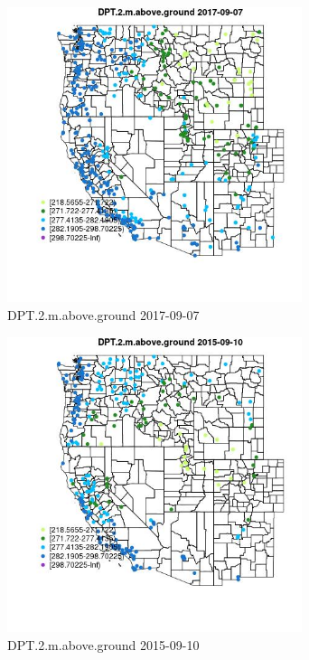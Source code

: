 \begin{figure} 
\centering  
\includegraphics[width=0.77\textwidth]{Code_Outputs/Report_ML_input_PM25_Step4_part_e_de_duplicated_aves_compiled_2019-05-21wNAs_MapObsDPT2maboveground2017-09-07.jpg} 
\caption{\label{fig:Report_ML_input_PM25_Step4_part_e_de_duplicated_aves_compiled_2019-05-21wNAsMapObsDPT2maboveground2017-09-07}DPT.2.m.above.ground 2017-09-07} 
\end{figure} 
 

\begin{figure} 
\centering  
\includegraphics[width=0.77\textwidth]{Code_Outputs/Report_ML_input_PM25_Step4_part_e_de_duplicated_aves_compiled_2019-05-21wNAs_MapObsDPT2maboveground2015-09-10.jpg} 
\caption{\label{fig:Report_ML_input_PM25_Step4_part_e_de_duplicated_aves_compiled_2019-05-21wNAsMapObsDPT2maboveground2015-09-10}DPT.2.m.above.ground 2015-09-10} 
\end{figure} 
 

